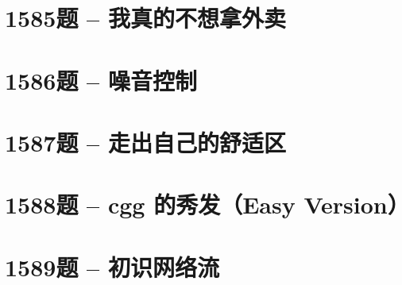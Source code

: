 \documentclass{math}
\begin{document}
\section{1585题 -- 我真的不想拿外卖}


\section{1586题 -- 噪音控制}


\section{1587题 -- 走出自己的舒适区}


\section{1588题 -- cgg 的秀发（Easy Version）}


\section{1589题 -- 初识网络流}

\end{document}
